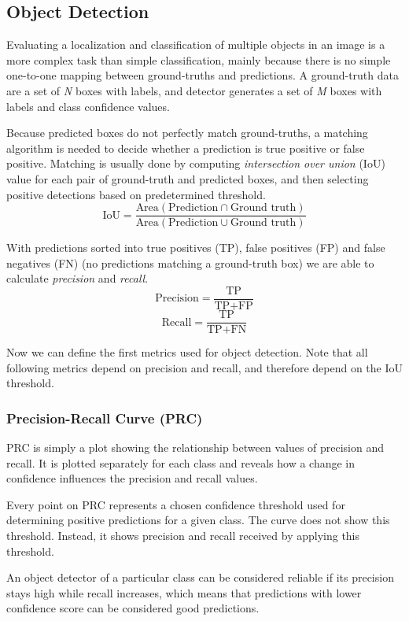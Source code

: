 \subsection{Object Detection}
Evaluating a localization and classification of multiple objects in an image is a more complex task than simple classification, mainly because there is no simple one-to-one mapping between ground-truths and predictions. A ground-truth data are a set of \textit{N} boxes with labels, and detector generates a set of \textit{M} boxes with labels and class confidence values.

Because predicted boxes do not perfectly match ground-truths, a matching algorithm is needed to decide whether a prediction is true positive or false positive. Matching is usually done by computing \textit{intersection over union} (IoU) value for each pair of ground-truth and predicted boxes, and then selecting positive detections based on predetermined threshold.
$$\text{IoU} = \frac{\text{Area}(\text{Prediction} \cap \text{Ground truth})}{\text{Area}(\text{Prediction} \cup \text{Ground truth})}$$

With predictions sorted into true positives (TP), false positives (FP) and false negatives (FN) (no predictions matching a ground-truth box) we are able to calculate \textit{precision} and \textit{recall}.
$$\text{Precision} = \frac{\text{TP}}{\text{TP}+\text{FP}}$$
$$\text{Recall} = \frac{\text{TP}}{\text{TP}+\text{FN}}$$

Now we can define the first metrics used for object detection. Note that all following metrics depend on precision and recall, and therefore depend on the IoU threshold.

\subsubsection{Precision-Recall Curve (PRC)}
PRC is simply a plot showing the relationship between values of precision and recall. It is plotted separately for each class and reveals how a change in confidence influences the precision and recall values. 

Every point on PRC represents a chosen confidence threshold used for determining positive predictions for a given class. The curve does not show this threshold. Instead, it shows precision and recall received by applying this threshold.

An object detector of a particular class can be considered reliable if its precision stays high while recall increases, which means that predictions with lower confidence score can be considered good predictions.

